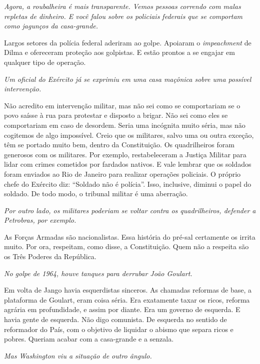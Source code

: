 \itshape
 Agora, a roubalheira é mais transparente. Vemos pessoas
correndo com malas repletas de dinheiro. E você falou sobre os policiais
federais que se comportam como jagunços da casa-grande.

\normalfont 
Largos setores da polícia federal aderiram ao golpe.
Apoiaram o \emph{impeachment} de Dilma e ofereceram proteção aos
golpistas. E estão prontos a se engajar em qualquer tipo de operação.

\itshape
 Um oficial do Exército já se exprimiu em uma casa
maçônica sobre uma possível intervenção.

\normalfont 
Não acredito em intervenção militar, mas não sei como se
comportariam se o povo saísse à rua para protestar e disposto a brigar.
Não sei como eles se comportariam em caso de desordem. Seria uma
incógnita muito séria, mas não cogitemos de algo impossível. Creio que
os militares, salvo uma ou outra exceção, têm se portado muito bem,
dentro da Constituição. Os quadrilheiros foram generosos com os
militares. Por exemplo, restabeleceram a Justiça Militar para lidar com
crimes cometidos por fardados nativos. E vale lembrar que os soldados
foram enviados ao Rio de Janeiro para realizar operações policiais. O
próprio chefe do Exército diz: ``Soldado não é polícia''. Isso,
inclusive, diminui o papel do soldado. De todo modo, o tribunal militar
é uma aberração.

\itshape
 Por outro lado, os militares poderiam se voltar contra
os quadrilheiros, defender a Petrobras, por exemplo.

\normalfont 
As Forças Armadas são nacionalistas. Essa história do
pré-sal certamente os irrita muito. Por ora, respeitam, como disse, a
Constituição. Quem não a respeita são os Três Poderes da República.

\itshape
 No golpe de
1964, houve tanques para derrubar João Goulart.

\normalfont 
Em volta de Jango havia esquerdistas sinceros. As
chamadas reformas de base, a plataforma de Goulart, eram coisa séria.
Era exatamente taxar os ricos, reforma agrária em profundidade, e assim
por diante. Era um governo de esquerda. E havia gente de esquerda. Não
digo comunista. De esquerda no sentido de reformador do País, com o
objetivo de liquidar o abismo que separa ricos e pobres. Queriam acabar
com a casa-grande e a senzala.

\itshape
 Mas Washington viu a situação de outro ângulo.

